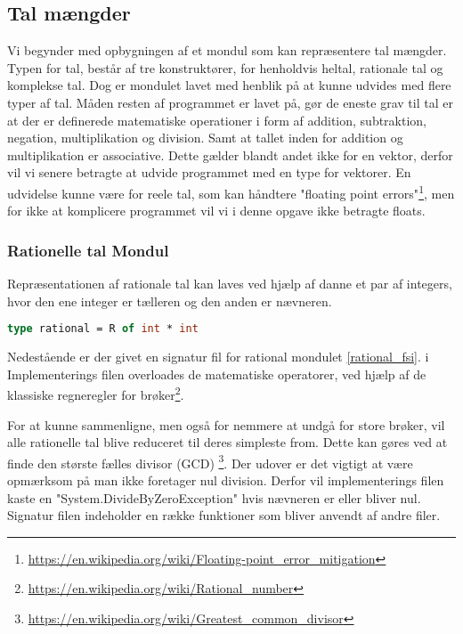 \documentclass{article}
\begin{document}
\subsection{Tal mængder}
Vi begynder med opbygningen af et mondul som kan repræsentere tal mængder. Typen for tal, består af tre konstruktører, for henholdvis heltal, rationale tal og komplekse tal. Dog er mondulet lavet med henblik på at kunne udvides med flere typer af tal. Måden resten af programmet er lavet på, gør de eneste grav til tal er at der er definerede matematiske operationer i form af addition, subtraktion, negation, multiplikation og division. Samt at tallet inden for addition og multiplikation er associative. Dette gælder blandt andet ikke for en vektor, derfor vil vi senere betragte at udvide programmet med en type for vektorer. En udvidelse kunne være for reele tal, som kan håndtere "floating point errors"\footnote{\url{https://en.wikipedia.org/wiki/Floating-point_error_mitigation}}, men for ikke at komplicere programmet vil vi i denne opgave ikke betragte floats.  

\subsubsection{Rationelle tal Mondul}
Repræsentationen af rationale tal kan laves ved hjælp af danne et par af integers, hvor den ene integer er tælleren og den anden er nævneren. 

\begin{lstlisting}[language={FSharp}, label={lst:fsharp_factorial}, caption={Typen for rationelle tal}]
type rational = R of int * int
\end{lstlisting}

Nedestående er der givet en signatur fil for rational mondulet \ref{rational_fsi}. i Implementerings filen overloades de matematiske operatorer, ved hjælp af de klassiske regneregler for brøker\footnote{\url{https://en.wikipedia.org/wiki/Rational_number}}. 


For at kunne sammenligne, men også for nemmere at undgå for store brøker, vil alle rationelle tal blive reduceret til deres simpleste from. Dette kan gøres ved at finde den største fælles divisor (GCD) \footnote{\url{https://en.wikipedia.org/wiki/Greatest_common_divisor}}. Der udover er det vigtigt at være opmærksom på man ikke foretager nul division. Derfor vil implementerings filen kaste en "System.DivideByZeroException" hvis nævneren er eller bliver nul. Signatur filen indeholder en række funktioner som bliver anvendt af andre filer. 
 
\end{document}
